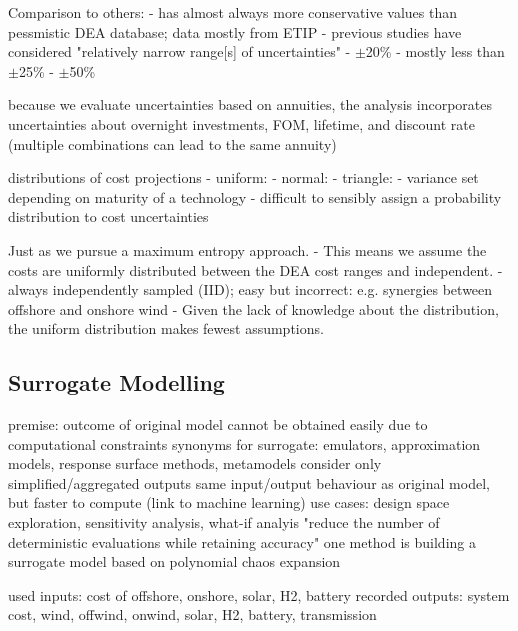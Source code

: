 Comparison to others:
- \cite{trondle_trade-offs_2020} has almost always more conservative values than pessmistic DEA database; data mostly from ETIP
- previous studies have considered "relatively narrow range[s] of uncertainties" \cite{Li2017}
- $\pm$20\% \cite{moret_characterization_2017}
- mostly less than $\pm$25\% \cite{pizarro-alonso_uncertainties_2019}
- $\pm$50\% \cite{shirizadeh_how_2019}

because we evaluate uncertainties based on annuities,
the analysis incorporates uncertainties about
overnight investments, FOM, lifetime, and discount rate
(multiple combinations can lead to the same annuity)


distributions of cost projections
- uniform: \cite{moret_characterization_2017,moret_robust_2016,shirizadeh_how_2019,trondle_trade-offs_2020,pilpola_analyzing_2020,Li2017,Trutnevyte2013,lopion_cost_2019}
- normal: \cite{mavromatidis_uncertainty_2018}
- triangle: \cite{li_using_2020}
- variance set depending on maturity of a technology \cite{li_using_2020}
- difficult to sensibly assign a probability distribution to cost uncertainties \cite{moret_robust_2016}

Just as \cite{trondle_trade-offs_2020} we pursue a maximum entropy approach. 
- This means we assume the costs are uniformly distributed between the DEA cost ranges and independent.
- always independently sampled (IID); easy but incorrect: e.g. synergies between offshore and onshore wind
- Given the lack of knowledge about the distribution, the uniform distribution makes fewest assumptions.

\subsection{Surrogate Modelling}
\label{sec:surrogate}

premise: outcome of original model cannot be obtained easily due to computational constraints
synonyms for surrogate: emulators, approximation models, response surface methods, metamodels
consider only simplified/aggregated outputs
same input/output behaviour as original model, but faster to compute (link to machine learning)
use cases: design space exploration, sensitivity analysis, what-if analyis
"reduce the number of deterministic evaluations while retaining accuracy" \cite{palar_multi-fidelity_2016}
one method is building a surrogate model based on polynomial chaos expansion

used inputs: cost of offshore, onshore, solar, H2, battery
recorded outputs: system cost, wind, offwind, onwind, solar, H2, battery, transmission

